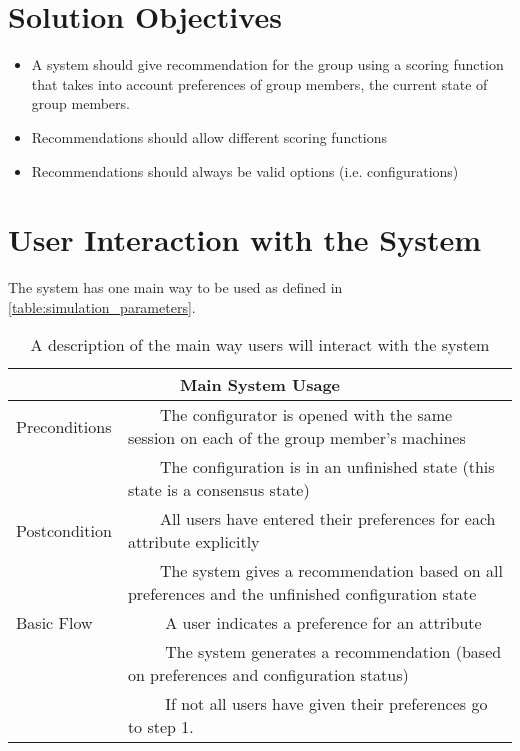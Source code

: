 \documentclass{article}
\newcommand{\tabitem}[1][\textbullet]{~~\llap{#1}~~}
\begin{document}
\section{Solution Objectives}

\begin{itemize}
    \item A system should give recommendation for the group using a scoring function that takes into account preferences of group members, the current state of group members.
    \item Recommendations should allow different scoring functions
    \item Recommendations should always be valid options (i.e. configurations)
\end{itemize}

\section{User Interaction with the System}
The system has one main way to be used as defined in \autoref{table:simulation_parameters}.

\begin{table}
    \begin{center}
        \begin{tabularx}{\columnwidth}{l|X}
            \multicolumn{2}{c}{Main System Usage} \\
            \hline
            Preconditions   & \tabitem The configurator is opened with the same session on each of the group member's machines \\
                            & \tabitem The configuration is in an unfinished state (this state is a consensus state)\\
            \hline
            Postcondition   & \tabitem All users have entered their preferences for each attribute explicitly \\
                            & \tabitem The system gives a recommendation based on all preferences and the unfinished configuration state \\
            \hline
            Basic Flow      & \tabitem[1.] A user indicates a preference for an attribute \\
                            & \tabitem[2.] The system generates a recommendation (based on preferences and configuration status) \\
                            & \tabitem[3.] If not all users have given their preferences go to step 1. \\
            \hline
        \end{tabularx}
        \caption{A description of the main way users will interact with the system}
    \end{center}
\end{table}
\end{document}
